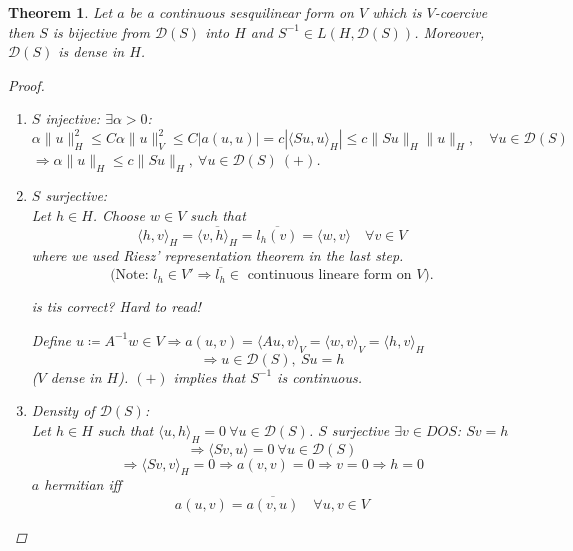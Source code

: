 \documentclass[12pt]{extreport} %
\newcommand{\DO}[1]{\mathcal{D}\left( {#1} \right)}
\theoremstyle{named}
\theoremstyle{nnamed}
\theoremstyle{itshape}
\newtheorem{theorem}{Theorem}  \counterwithin{theorem}{chapter}
\theoremstyle{normal}
\begin{document}
\begin{theorem} \label{thm:2.3}
	Let $a$ be a continuous sesquilinear form on $V$ which is $V$-coercive then $S$ is bijective from $\DO{S}$ into $H$ and $S^{-1} \in L(H, \DO{S})$. Moreover, $\DO{S}$ is dense in $H$.
	
	\begin{proof} ~\
		\begin{enumerate}[label=\arabic*\upshape)]
			\item $S$ injective: $\exists \alpha > 0$: 
				$$ \alpha \| u \|^2_H \leq C \alpha \| u \|^2_V \leq C \left| a (u,u) \right| = c \left| \langle S u, u \rangle_H \right| \leq c \| Su\|_H \| u \|_H, \quad \forall u \in \DO{S} $$
				$\Rightarrow \alpha \|u\|_H \leq c \| Su\|_H, ~ \forall u \in \DO{S} ~(+)$.
			\item $S$ surjective: ~\\
				Let $h \in H$. Choose $w \in V$ such that
				$$ \langle h, v \rangle_H = \overline{\langle v, h \rangle_H} = \overline{l_h(v)} = \langle w, v \rangle \quad \forall v \in V $$
				where we used Riesz' representation theorem in the last step. 
				$$\text{(Note: $l_h \in V' \Rightarrow \overline{l_h} \in$ continuous lineare form on $V$).} $$  
				\begin{center}
					\textit{\color{red} is tis correct? Hard to read!}
				\end{center} %
				Define $u \coloneqq A^{-1} w \in V \Rightarrow a(u,v) = \langle A u, v \rangle_V = \langle w, v \rangle_V = \langle h, v \rangle_H$
				$$ \Rightarrow u \in \DO{S}, ~Su = h $$
				($V$ dense in $H$). $(+)$ implies that $S^{-1}$ is continuous.
			\item Density of $\DO{S}$: ~\\
				Let $h \in H$ such that $\langle u, h \rangle_H = 0 ~\forall u \in \DO{S}$. $S$ surjective $\exists v \in DO{S}$: $Sv = h$
				$$ \Rightarrow \langle Sv, u \rangle = 0 ~ \forall u \in \DO{S} $$
				$$ \Rightarrow \langle Sv, v \rangle_H = 0 \Rightarrow a(v, v) = 0 \Rightarrow v = 0 \Rightarrow h = 0 $$
				$a$ hermitian iff
				$$ a(u,v) = \overline{a(v, u)} \quad \forall u, v \in V $$
		\end{enumerate}
	\end{proof}	
\end{theorem}
\end{document}
